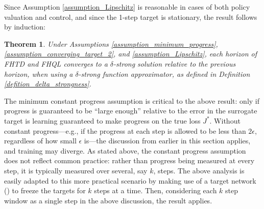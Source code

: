 \documentclass{article}
\newtheorem{theorem}{Theorem}
\begin{document}
Since Assumption \ref{assumption_Lipschitz} is reasonable in cases of both policy valuation and control, and since the 1-step target is stationary, the result follows by induction:

\begin{theorem}
Under Assumptions \ref{assumption_minimum_progress}, \ref{assumption_converging_target_2}, and \ref{assumption_Lipschitz}, each horizon of FHTD and FHQL converges to a $\delta$-strong solution relative to the previous horizon, when using a $\delta$-strong function approximator, as defined in Definition \ref{defition_delta_strongness}.
\end{theorem}

The minimum constant progress assumption is critical to the above result: only if progress is guaranteed to be ``large enough'' relative to the error in the surrogate target is learning guaranteed to make progress on the true loss $J^*$. Without constant progress---e.g., if the progress at each step is allowed to be less than $2\epsilon$, regardless of how small $\epsilon$ is---the discussion from earlier in this section applies, and training may diverge. As stated above, the constant progress assumption does not reflect common practice: rather than progress being measured at every step, it is typically measured over several, say $k$, steps. The above analysis is easily adapted to this more practical scenario by making use of a target network (\cite{mnih2013playing}) to freeze the targets for $k$ steps at a time. Then, considering each $k$ step window as a single step in the above discussion, the result applies.



\end{document}
